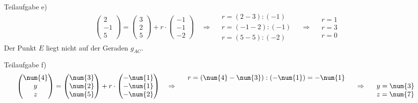 \begin{exercise}
    Teilaufgabe e)
    \begin{equation*}
    \begin{pmatrix}
      \num{2}  \\
      -\num{1} \\
      \num{5}
    \end{pmatrix}
    =
    \begin{pmatrix}
      \num{3} \\
      \num{2} \\
      \num{5}
    \end{pmatrix}
    +r\cdot
    \begin{pmatrix}
      -\num{1} \\
      -\num{1} \\
      -\num{2}
    \end{pmatrix}
    \quad\Rightarrow\quad
    \begin{array}{l}
      r=\left(\num{2}-\num{3}\right):\left(-\num{1}\right) \\
      r=\left(-\num{1}-\num{2}\right):\left(-\num{1}\right) \\
      r=\left(\num{5}-\num{5}\right):\left(-\num{2}\right)
    \end{array}
    \quad\Rightarrow\quad
    \begin{array}{l}
      r=\num{1} \\
      r=\num{3} \\
      r=\num{0}
    \end{array}
    \end{equation*}
    Der Punkt $E$ liegt nicht auf der Geraden $g_{AC}$.

    Teilaufgabe f)
    \begin{equation*}
    \begin{pmatrix}
      \num{4} \\
      y       \\
      z
    \end{pmatrix}
    =
    \begin{pmatrix}
      \num{3} \\
      \num{2} \\
      \num{5}
    \end{pmatrix}
    +r\cdot
    \begin{pmatrix}
      -\num{1} \\
      -\num{1} \\
      -\num{2}
    \end{pmatrix}
    \quad\Rightarrow\quad
    \begin{array}{c}
    r=(\num{4}-\num{3}):\left(-\num{1}\right)=-\num{1} \\
    \relax \\
    \relax
    \end{array}
    \quad\Rightarrow\quad
    \begin{array}{l}
    \relax \\
    y=\num{3} \\
    z=\num{7}
    \end{array}
    \end{equation*}


\end{exercise}
